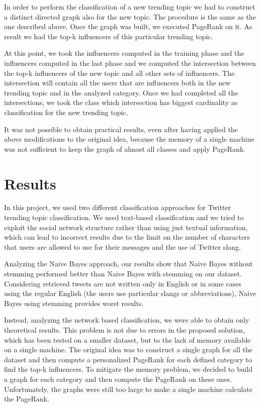 \documentclass[journal,11pt]{vgtc}
\begin{document}
In order to perform the classification of a new trending topic we had to construct a distinct directed graph
also for the new topic. The procedure is the same as the one described above.
Once the graph was built, we executed PageRank on it.
As result we had the top-k influencers of this particular trending topic.

At this point, we took the influencers computed in the training phase and the influencers computed in the
last phase and we computed the intersection between the top-k influencers of the new topic and
all other sets of influencers.
The intersection will contain all the users that are influencers both
in the new trending topic and in the analyzed category.
Once we had completed all the intersections, we took the class which intersection has biggest cardinality
as classification for the new trending topic.

It was not possible to obtain practical results, even after having applied the above modifications
to the original idea, because the memory of a single machine was not sufficient to keep the graph of almost all
classes and apply PageRank.

\section{Results}
In this project, we used two different classification approaches for Twitter trending topic classification.
We used text-based classification and we tried to exploit the social network structure rather than
using just textual information, which can lead to incorrect results due to the limit on the number of characters
that users are allowed to use for their messages and the use of Twitter slang.

Analyzing the Naive Bayes approach, our results show that Naive Bayes without stemming
performed better than Naive Bayes with stemming on our dataset. Considering retrieved tweets are not
written only in English or in some cases using the regular English (the users use particular slangs or abbreviations),
Naive Bayes using stemming provides worst results.

Instead, analyzing the network based classification, we were able to obtain only theoretical results.
This problem is not due to errors in the proposed solution, which has been tested on a smaller dataset,
but to the lack of memory available on a single machine.
The original idea was to construct a single graph for all the dataset and then compute a personalized
PageRank for each defined category to find the top-k influencers. To mitigate the memory problem, we decided
to build a graph for each category and then compute the PageRank on these ones.
Unfortunately, the graphs were still too large to make a single machine calculate the PageRank.








\end{document}
